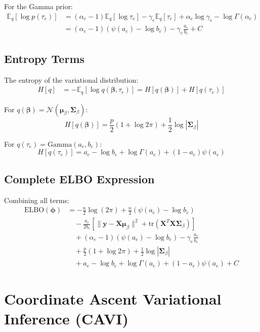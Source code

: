 \documentclass[11pt]{article}
\newcommand{\E}{\mathbb{E}}
\newcommand{\N}{\mathcal{N}}
\newcommand{\ELBO}{\text{ELBO}}
\newcommand{\tr}{\text{tr}}
\begin{document}
For the Gamma prior:
\begin{align}
\E_{q}[\log p(\tau_e)] &= (\alpha_e - 1)\E_q[\log \tau_e] - \gamma_e \E_q[\tau_e] + \alpha_e \log \gamma_e - \log \Gamma(\alpha_e) \nonumber\\
&= (\alpha_e - 1)(\psi(a_e) - \log b_e) - \gamma_e \frac{a_e}{b_e} + C
\label{eq:exp_prior_tau}
\end{align}

\subsection{Entropy Terms}

The entropy of the variational distribution:
\begin{align}
H[q] &= -\E_q[\log q(\bm{\beta}, \tau_e)] = H[q(\bm{\beta})] + H[q(\tau_e)]
\end{align}

For $q(\bm{\beta}) = \N(\bm{\mu}_\beta, \bm{\Sigma}_\beta)$:
\begin{equation}
H[q(\bm{\beta})] = \frac{p}{2}(1 + \log 2\pi) + \frac{1}{2}\log |\bm{\Sigma}_\beta|
\label{eq:entropy_beta}
\end{equation}

For $q(\tau_e) = \text{Gamma}(a_e, b_e)$:
\begin{equation}
H[q(\tau_e)] = a_e - \log b_e + \log \Gamma(a_e) + (1-a_e)\psi(a_e)
\label{eq:entropy_tau}
\end{equation}

\subsection{Complete ELBO Expression}

Combining all terms:
\begin{align}
\ELBO(\bm{\phi}) &= -\frac{n}{2}\log(2\pi) + \frac{n}{2}(\psi(a_e) - \log b_e) \nonumber\\
&\quad - \frac{a_e}{2b_e} \left[\|\bm{y} - \bm{X}\bm{\mu}_\beta\|^2 + \tr(\bm{X}^T\bm{X}\bm{\Sigma}_\beta)\right] \nonumber\\
&\quad + (\alpha_e - 1)(\psi(a_e) - \log b_e) - \gamma_e \frac{a_e}{b_e} \nonumber\\
&\quad + \frac{p}{2}(1 + \log 2\pi) + \frac{1}{2}\log |\bm{\Sigma}_\beta| \nonumber\\
&\quad + a_e - \log b_e + \log \Gamma(a_e) + (1-a_e)\psi(a_e) + C
\label{eq:elbo_full}
\end{align}

\section{Coordinate Ascent Variational Inference (CAVI)}
\end{document}
